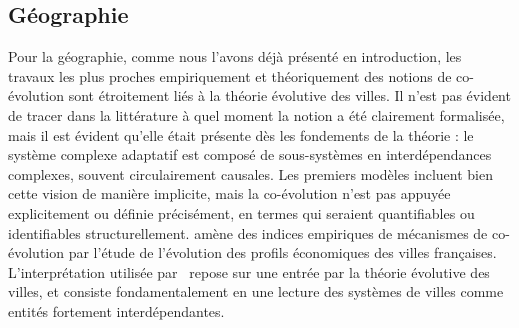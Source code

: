 \documentclass[11pt]{article}
\begin{document}
\subsection{Géographie}
Pour la géographie, comme nous l'avons déjà présenté en introduction, les travaux les plus proches empiriquement et théoriquement des notions de co-évolution sont étroitement liés à la théorie évolutive des villes. Il n'est pas évident de tracer dans la littérature à quel moment la notion a été clairement formalisée, mais il est évident qu'elle était présente dès les fondements de la théorie \citep{pumain1997pour}: le système complexe adaptatif est composé de sous-systèmes en interdépendances complexes, souvent circulairement causales. Les premiers modèles incluent bien cette vision de manière implicite, mais la co-évolution n'est pas appuyée explicitement ou définie précisément, en termes qui seraient quantifiables ou identifiables structurellement. \cite{paulus2004coevolution} amène des indices empiriques de mécanismes de co-évolution par l'étude de l'évolution des profils économiques des villes françaises. L'interprétation utilisée par~\cite{schmitt2014modelisation} repose sur une entrée par la théorie évolutive des villes, et consiste fondamentalement en une lecture des systèmes de villes comme entités fortement interdépendantes.


\end{document}
